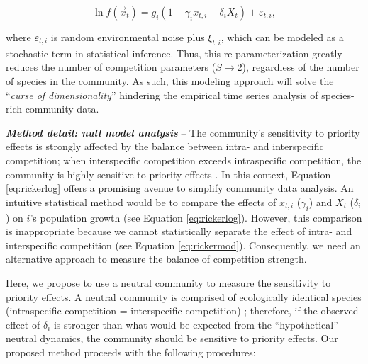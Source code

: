 \documentclass[12pt, class=article, crop=false]{standalone}
\begin{document}
\begin{equation}
\label{eq:rickerlog}
    \ln f(\overset{\rightarrow}{x}_{t}) = g_i (1 - \gamma_i x_{t,i} - \delta_i X_t) + \varepsilon_{t,i},
\end{equation}

where $\varepsilon_{t,i}$ is random environmental noise plus $\xi_{t,i}$, which can be modeled as a stochastic term in statistical inference. Thus, this re-parameterization greatly reduces the number of competition parameters ($S \rightarrow 2$), \ul{regardless of the number of species in the community}.
As such, this modeling approach will solve the ``\textit{curse of dimensionality}'' hindering the empirical time series analysis of species-rich community data.

\textbf{\textit{Method detail: null model analysis}} --
The community's sensitivity to priority effects is strongly affected by the balance between intra- and interspecific competition; when interspecific competition exceeds intraspecific competition, the community is highly sensitive to priority effects \citep{ke_coexistence_2018}.
In this context, Equation \ref{eq:rickerlog} offers a promising avenue to simplify community data analysis. 
An intuitive statistical method would be to compare the effects of $x_{t,i}$ ($\gamma_i$) and $X_t$ ($\delta_i$) on $i$'s population growth (see Equation \ref{eq:rickerlog}).
However, this comparison is inappropriate because we cannot statistically separate the effect of intra- and interspecific competition (see Equation \ref{eq:rickermod}).
Consequently, we need an alternative approach to measure the balance of competition strength.

Here, \ul{we propose to use a neutral community to measure the sensitivity to priority effects.} 
A neutral community is comprised of ecologically identical species (intraspecific competition = interspecific competition) \citep{hubbell_unified_2001, loreau_species_2008}; therefore, if the observed effect of $\delta_i$ is stronger than what would be expected from the ``hypothetical'' neutral dynamics, the community should be sensitive to priority effects.
Our proposed method proceeds with the following procedures:
\end{document}
